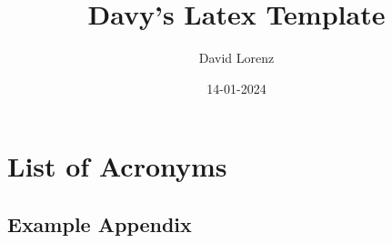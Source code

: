 \documentclass[a4paper,12pt]{article}
\author{David Lorenz}
\title{Davy's Latex Template}
\date{14-01-2024}
\begin{document}
\maketitle
\thispagestyle{empty}
\newpage
\tableofcontents
\newpage



\section*{List of Acronyms}
\begin{acronym}
\end{acronym}

\printbibliography

\begin{appendices}
\section{Example Appendix}\label{append:example}
\end{appendices}
\end{document}
